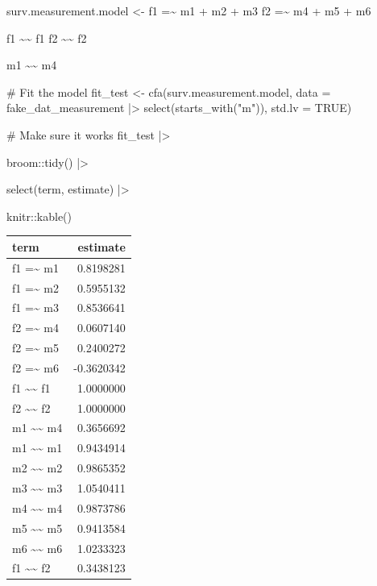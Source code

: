 \documentclass[
  letterpaper,
  DIV=11,
  numbers=noendperiod]{scrreprt}
\newenvironment{Shaded}{\begin{snugshade}}{\end{snugshade}}
\newcommand{\AttributeTok}[1]{\textcolor[rgb]{0.40,0.45,0.13}{#1}}
\newcommand{\CommentTok}[1]{\textcolor[rgb]{0.37,0.37,0.37}{#1}}
\newcommand{\ConstantTok}[1]{\textcolor[rgb]{0.56,0.35,0.01}{#1}}
\newcommand{\FunctionTok}[1]{\textcolor[rgb]{0.28,0.35,0.67}{#1}}
\newcommand{\NormalTok}[1]{\textcolor[rgb]{0.00,0.23,0.31}{#1}}
\newcommand{\OtherTok}[1]{\textcolor[rgb]{0.00,0.23,0.31}{#1}}
\newcommand{\SpecialCharTok}[1]{\textcolor[rgb]{0.37,0.37,0.37}{#1}}
\newcommand{\StringTok}[1]{\textcolor[rgb]{0.13,0.47,0.30}{#1}}
\begin{document}
\begin{Shaded}
\begin{Highlighting}[]
\NormalTok{surv.measurement.model }\OtherTok{\textless{}{-}} \StringTok{\textquotesingle{} }
\StringTok{  f1 =\textasciitilde{} m1 + m2 + m3}
\StringTok{  f2 =\textasciitilde{} m4 + m5 + m6}

\StringTok{  f1 \textasciitilde{}\textasciitilde{} f1}
\StringTok{  f2 \textasciitilde{}\textasciitilde{} f2}

\StringTok{  m1 \textasciitilde{}\textasciitilde{} m4}
\StringTok{\textquotesingle{}}

\CommentTok{\# Fit the model}
\NormalTok{fit\_test }\OtherTok{\textless{}{-}} \FunctionTok{cfa}\NormalTok{(surv.measurement.model, }\AttributeTok{data =}\NormalTok{ fake\_dat\_measurement }\SpecialCharTok{|\textgreater{}} \FunctionTok{select}\NormalTok{(}\FunctionTok{starts\_with}\NormalTok{(}\StringTok{"m"}\NormalTok{)), }\AttributeTok{std.lv =} \ConstantTok{TRUE}\NormalTok{)}

\CommentTok{\# Make sure it works}
\NormalTok{fit\_test }\SpecialCharTok{|\textgreater{}} 

\NormalTok{  broom}\SpecialCharTok{::}\FunctionTok{tidy}\NormalTok{() }\SpecialCharTok{|\textgreater{}}

  \FunctionTok{select}\NormalTok{(term, estimate) }\SpecialCharTok{|\textgreater{}}

\NormalTok{  knitr}\SpecialCharTok{::}\FunctionTok{kable}\NormalTok{()}
\end{Highlighting}
\end{Shaded}

\begin{longtable}[]{@{}lr@{}}
\toprule()
term & estimate \\
\midrule()
\endhead
f1 =\textasciitilde{} m1 & 0.8198281 \\
f1 =\textasciitilde{} m2 & 0.5955132 \\
f1 =\textasciitilde{} m3 & 0.8536641 \\
f2 =\textasciitilde{} m4 & 0.0607140 \\
f2 =\textasciitilde{} m5 & 0.2400272 \\
f2 =\textasciitilde{} m6 & -0.3620342 \\
f1 \textasciitilde\textasciitilde{} f1 & 1.0000000 \\
f2 \textasciitilde\textasciitilde{} f2 & 1.0000000 \\
m1 \textasciitilde\textasciitilde{} m4 & 0.3656692 \\
m1 \textasciitilde\textasciitilde{} m1 & 0.9434914 \\
m2 \textasciitilde\textasciitilde{} m2 & 0.9865352 \\
m3 \textasciitilde\textasciitilde{} m3 & 1.0540411 \\
m4 \textasciitilde\textasciitilde{} m4 & 0.9873786 \\
m5 \textasciitilde\textasciitilde{} m5 & 0.9413584 \\
m6 \textasciitilde\textasciitilde{} m6 & 1.0233323 \\
f1 \textasciitilde\textasciitilde{} f2 & 0.3438123 \\
\bottomrule()
\end{longtable}
\end{document}
